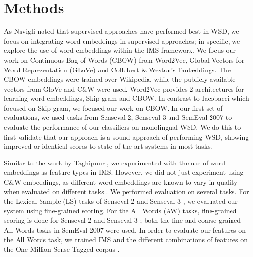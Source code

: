 \section{Methods}
\label{section:methods}

As Navigli  noted that supervised approaches have performed best in WSD, we focus on integrating word embeddings in supervised approaches; in specific,
we explore the use of word embeddings within the IMS framework. We focus our work on Continuous Bag of Words (CBOW) from Word2Vec,  Global Vectors for Word Representation (GLoVe) and Collobert \& Weston's Embeddings. The CBOW embeddings were trained over Wikipedia, while the publicly available vectors from GloVe and C\&W were used. Word2Vec provides 2 architectures for learning word embeddings, Skip-gram and CBOW. In contrast to Iacobacci  which focused on Skip-gram, we focused our work on CBOW.
In our first set of evaluations, we used tasks from Senseval-2, Senseval-3 and SemEval-2007 to evaluate the performance of our classifiers on monolingual WSD. We do this to first validate that our approach is a sound approach of performing WSD, showing improved or identical scores to state-of-the-art systems in most tasks. 

Similar to the work by Taghipour , we experimented with the use of word embeddings as feature types in IMS. However, we did not just experiment using C\&W embeddings, as different word embeddings are known to vary in quality when evaluated on different tasks \cite{schnabel2015evaluation}. We performed evaluation on several tasks. For the Lexical Sample (LS) tasks of Senseval-2 \cite{senseval2-LS-kilgarriff2001} and Senseval-3 \cite{senseval3-LS-mihalcea2004}, we evaluated our system using fine-grained scoring. For the All Words (AW) tasks, fine-grained scoring is done for Senseval-2 \cite{senseval2-AW-palmer2001} and Senseval-3 \cite{senseval3-AW-snyder2004}; both the fine \cite{semeval2007-fine-pradhan2007} and coarse-grained \cite{semeval2007-coarse-navigli2007} All Words tasks in SemEval-2007 were used. In order to evaluate our features on the All Words task, we trained IMS and the different combinations of features on the One Million Sense-Tagged corpus \cite{taghipour2015one}.

